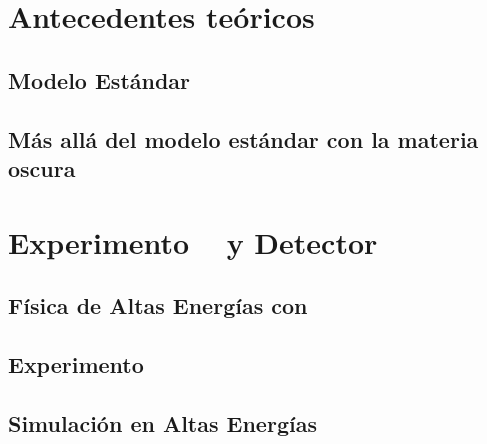 \documentclass[12pt]{report}
\begin{document}



\chapter{Antecedentes teóricos}


	\section{Modelo Estándar} 	
	

	\section{M\'as all\'a del modelo est\'andar con la materia oscura}
	
	
				


\chapter{Experimento \LHC ~ y Detector \CMS}

		
	\section{Física de Altas Energías con \LHC}
	
	
	\section{Experimento \CMS}\label{Experimento_CMS}
	

		
	\section{Simulación en Altas Energías}
	
	
	
\end{document}
